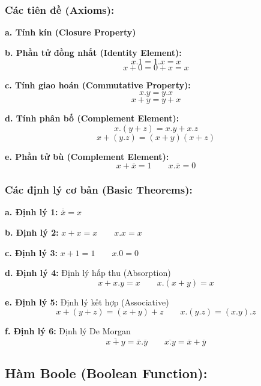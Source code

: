 \subsubsection{Các tiên đề (Axioms):}
\textbf{a. Tính kín (Closure Property)}

\textbf{b. Phần tử đồng nhất (Identity Element):}
\[
    x.1 = 1.x = x
\]
\[
    x+0 = 0+x = x
\]

\textbf{c. Tính giao hoán (Commutative Property):}
\[
    x.y = y.x
\]
\[
    x+y = y+x
\]

\textbf{d. Tính phân bố (Complement Element):}
\[
    x.(y+z) = x.y + x.z
\]
\[
    x+(y.z)=(x+y)(x+z)
\]

\textbf{e. Phần tử bù (Complement Element):}
\[
    x+\overline{x}=1 \qquad x.\overline{x} = 0
\]
\subsubsection{Các định lý cơ bản (Basic Theorems):}
\textbf{a. Định lý 1:} $\overline{\overline{x}} = x$

\textbf{b. Định lý 2:} $x+x = x \qquad x.x=x$

\textbf{c. Định lý 3:} $x+1=1 \qquad x.0 = 0$

\textbf{d. Định lý 4:} Định lý hấp thu (Absorption)
\[
    x+x.y = x \qquad x.(x+y) = x
\]

\textbf{e. Định lý 5:} Định lý kết hợp (Associative)
\[
    x+(y+z) = (x+y) + z \qquad x.(y.z) = (x.y).z
\]

\textbf{f. Định lý 6:} Định lý De Morgan
\[
    \overline{x+y} = \overline{x}.\overline{y} \qquad \overline{x.y} = \overline{x}+\overline{y}
\]
\subsection{Hàm Boole (Boolean Function):}
